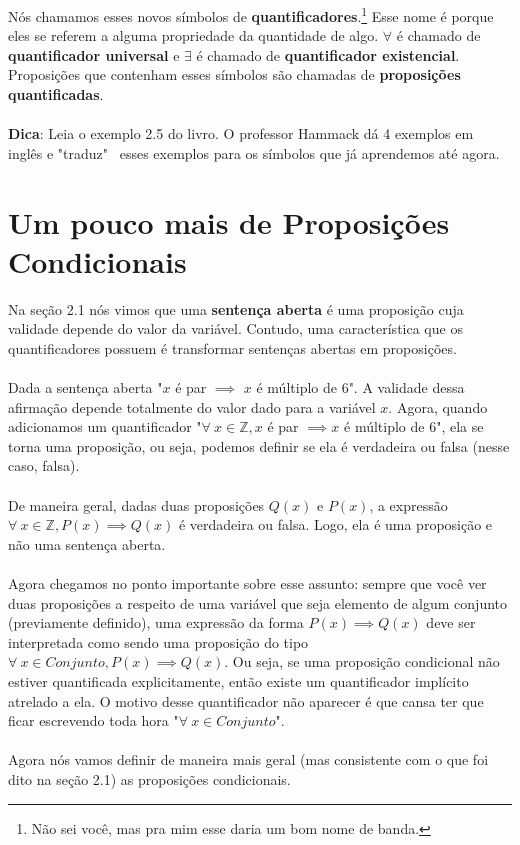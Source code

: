 \documentclass[a4paper,11pt,oneside]{book}
\theoremstyle{definition}
\theoremstyle{break}
\begin{document}
Nós chamamos esses novos símbolos de \textbf{quantificadores}.\footnote{Não sei você, mas pra mim esse daria um bom nome de banda.} Esse nome é porque eles se referem a alguma propriedade da quantidade de algo. $\forall$ é chamado de \textbf{quantificador universal} e $\exists$ é chamado de \textbf{quantificador existencial}. Proposições que contenham esses símbolos são chamadas de \textbf{proposições quantificadas}.
\\
\\
\textbf{Dica}: Leia o exemplo 2.5 do livro. O professor Hammack dá 4 exemplos em inglês e "traduz" \ esses exemplos para os símbolos que já aprendemos até agora.

\section{Um pouco mais de Proposições Condicionais}

Na seção 2.1 nós vimos que uma \textbf{sentença aberta} é uma proposição cuja validade depende do valor da variável. Contudo, uma característica que os quantificadores possuem é transformar sentenças abertas em proposições.
\\
\\
Dada a sentença aberta "$x$ é par $\implies$ $x$ é múltiplo de 6". A validade dessa afirmação depende totalmente do valor dado para a variável $x$. Agora, quando adicionamos um quantificador "$\forall \ x \in \mathbb{Z}, x$ é par $\implies x$ é múltiplo de 6", ela se torna uma proposição, ou seja, podemos definir se ela é verdadeira ou falsa (nesse caso, falsa).
\\
\\
De maneira geral, dadas duas proposições $Q(x)$ e $P(x)$, a expressão $\forall \ x \in \mathbb{Z}, P(x) \implies Q(x)$ é verdadeira ou falsa. Logo, ela é uma proposição e não uma sentença aberta.
\\
\\
Agora chegamos no ponto importante sobre esse assunto: sempre que você ver duas proposições a respeito de uma variável que seja elemento de algum conjunto (previamente definido), uma expressão da forma $P(x) \implies Q(x)$ deve ser interpretada como sendo uma proposição do tipo $\forall \ x \in Conjunto, P(x) \implies Q(x)$. Ou seja, se uma proposição condicional não estiver quantificada explicitamente, então existe um quantificador implícito atrelado a ela. O motivo desse quantificador não aparecer é que cansa ter que ficar escrevendo toda hora "$\forall \ x \in Conjunto$".
\\
\\
Agora nós vamos definir de maneira mais geral (mas consistente com o que foi dito na seção 2.1) as proposições condicionais.
\end{document}

